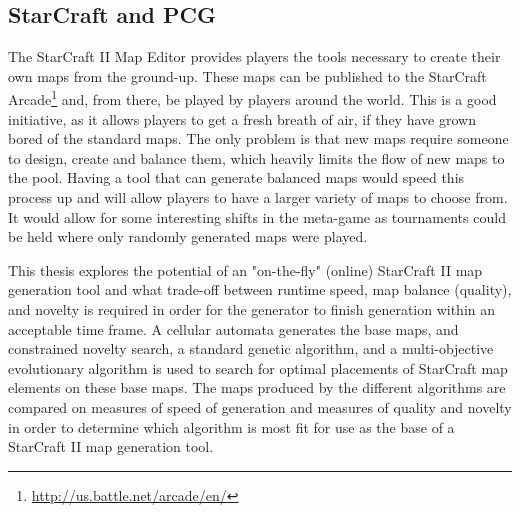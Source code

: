 
\subsection{StarCraft and PCG}
\label{introduction_starcraft_pcg}

The StarCraft II Map Editor provides players the tools necessary to create their own maps from the ground-up. These maps can be published to the StarCraft Arcade\footnote{\url{http://us.battle.net/arcade/en/}} and, from there, be played by players around the world. This is a good initiative, as it allows players to get a fresh breath of air, if they have grown bored of the standard maps. The only problem is that new maps require someone to design, create and balance them, which heavily limits the flow of new maps to the pool. Having a tool that can generate balanced maps would speed this process up and will allow players to have a larger variety of maps to choose from. It would allow for some interesting shifts in the meta-game as tournaments could be held where only randomly generated maps were played. 

This thesis explores the potential of an "on-the-fly" (online) StarCraft II map generation tool and what trade-off between runtime speed, map balance (quality), and novelty is required in order for the generator to finish generation within an acceptable time frame. A cellular automata generates the base maps, and constrained novelty search, a standard genetic algorithm, and a multi-objective evolutionary algorithm is used to search for optimal placements of StarCraft map elements on these base maps. The maps produced by the different algorithms are compared on measures of speed of generation and measures of quality and novelty in order to determine which algorithm is most fit for use as the base of a StarCraft II map generation tool. 